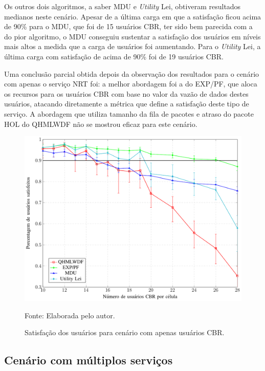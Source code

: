 Os outros dois algoritmos, a saber MDU e \textit{Utility} Lei, obtiveram resultados medianos neste cenário. Apesar de a última carga em que a satisfação ficou acima de 90\% para o MDU, que foi de 15 usuários CBR, ter sido bem parecida com a do pior algoritmo, o MDU conseguiu sustentar a satisfação dos usuários em níveis mais altos a medida que a carga de usuários foi aumentando. Para o \textit{Utility} Lei, a última carga com satisfação de acima de 90\% foi de 19 usuários CBR.

Uma conclusão parcial obtida depois da observação dos resultados para o cenário com apenas o serviço NRT foi: a melhor abordagem foi a do EXP/PF, que aloca os recursos para os usuários CBR com base no valor da vazão de dados destes usuários, atacando diretamente a métrica que define a satisfação deste tipo de serviço. A abordagem que utiliza tamanho da fila de pacotes e atraso do pacote HOL do QHMLWDF não se mostrou eficaz para este cenário.

\begin{figure}[htb]
	\centering	
	
	\caption[Satisfação dos usuários para cenário com apenas usuários CBR]{Satisfação dos usuários para cenário com apenas usuários CBR.}
	\includegraphics[width=1\textwidth]{figs/CBRAll.pdf}
	
	{Fonte: Elaborada pelo autor.}
	\label{fig:CBRAll}
\end{figure}

\subsection{Cenário com múltiplos serviços}

